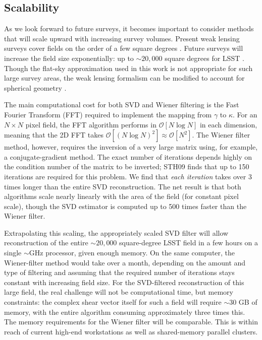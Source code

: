 \subsection{Scalability}
\label{Scalability} 

As we look forward to future surveys, it becomes important to consider methods 
that will scale upward with increasing survey volumes. Present weak lensing
surveys cover fields on the order of a few square degrees 
\citep[e.g.\ COSMOS,][]{Massey07}.  Future surveys will increase the field
size exponentially: up to $\sim\!\!20,000$ square degrees for LSST
\citep{LSST09}.  Though the flat-sky approximation used in this 
work is not appropriate for such large survey
areas, the weak lensing formalism can be modified to 
account for spherical geometry \citep[see, e.g.][]{Heavens03}. 

The main computational cost for both SVD and Wiener filtering is the
Fast Fourier Transform (FFT) required to implement the mapping from
$\gamma$ to $\kappa$.  For an $N \times N$ pixel field, the FFT algorithm 
performs in $\mathcal{O}[N\log N]$ in each dimension, 
meaning that the 2D FFT takes 
$\mathcal{O}[(N\log N)^2] \approx \mathcal{O}[N^2]$.  The Wiener
filter method, however, requires the inversion of a very large matrix 
using, for example, a conjugate-gradient method.  
The exact number of iterations
depends highly on the condition number of the matrix to be inverted;
STH09 finds that up to 150 iterations are required for this problem.
We find that \textit{each iteration} takes over 3 times longer than the 
entire SVD reconstruction. The net result is that both algorithms
scale nearly linearly with the area of the field (for constant pixel scale),
though the SVD estimator is computed up to 500 times faster 
than the Wiener filter. 

Extrapolating this scaling, the appropriately scaled 
SVD filter will allow reconstruction
of the entire $\sim\!\!20,000$ square-degree 
LSST field in a few hours on a single $\sim$GHz processor, given
enough memory.  On the same computer, the Wiener-filter method would take 
over a month, depending on the amount and type of filtering and 
assuming that the required number of iterations stays constant with 
increasing field size. For the SVD-filtered reconstruction of this 
large field, the real challenge will not be computational time, 
but memory constraints: the complex shear
vector itself for such a field will require $\sim\!\!30$ GB of memory,
with the entire algorithm consuming approximately three times this.
The memory requirements for the Wiener filter will be comparable.
This is within reach of current high-end workstations as well as 
shared-memory parallel clusters.

